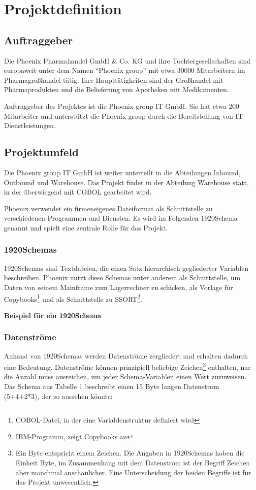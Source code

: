 \section{Projektdefinition}
\label{sec:Einleitung}
\subsection{Auftraggeber}
\label{sec:Auftraggeber}
Die Phoenix Pharmahandel GmbH \& Co. KG und ihre Tochtergesellschaften sind europaweit unter dem Namen ``Phoenix group'' mit etwa 30000 Mitarbeitern im Pharmagroßhandel tätig. Ihre Haupttätigkeiten sind der Großhandel mit Pharmaprodukten und die Belieferung von Apotheken mit Medikamenten.

Auftraggeber des Projektes ist die Phoenix group IT GmbH. Sie hat etwa 200 Mitarbeiter und unterstützt die Phoenix group durch die Bereitstellung von IT-Dienstleistungen.

\subsection{Projektumfeld} 
\label{sec:Projektumfeld}
Die Phoenix group IT GmbH ist weiter unterteilt in die Abteilungen Inbound, Outbound und Warehouse. Das Projekt findet in der Abteilung Warehouse statt, in der überwiegend mit COBOL gearbeitet wird.

Phoenix verwendet ein firmeneigenes Dateiformat als Schnittstelle zu verschiedenen Programmen und Diensten. Es wird im Folgenden 1920Schema genannt und spielt eine zentrale Rolle für das Projekt.

\subsubsection{1920Schemas}
1920Schemas sind Textdateien, die einen Satz hierarchisch gegliederter Variablen beschreiben. Phoenix nutzt diese Schemas unter anderem als Schnittstelle, um Daten von seinem Mainframe zum Lagerrechner zu schicken, als Vorlage für Copybooks\footnote{COBOL-Datei, in der eine Variablenstruktur definiert wird} und als Schnittstelle zu SSORT\footnote{IBM-Programm, zeigt Copybooks an}.

\textbf{Beispiel für ein 1920Schema}

\subsubsection{Datenströme}
Anhand von 1920Schemas werden Datenströme zergliedert und erhalten dadurch eine Bedeutung. Datenströme können prinzipiell beliebige Zeichen\footnote{Ein Byte entspricht einem Zeichen. Die Angaben in 1920Schemas haben die Einheit Byte, im Zusammenhang mit dem Datenstrom ist der Begriff Zeichen aber manchmal anschaulicher. Eine Unterscheidung der beiden Begriffe ist für das Projekt unwesentlich.} enthalten, nur die Anzahl muss ausreichen, um jeder Schema-Variablen einen Wert zuzuweisen. Das Schema aus Tabelle 1 beschreibt einen 15 Byte langen Datenstrom (5+4+2*3), der so aussehen könnte:

